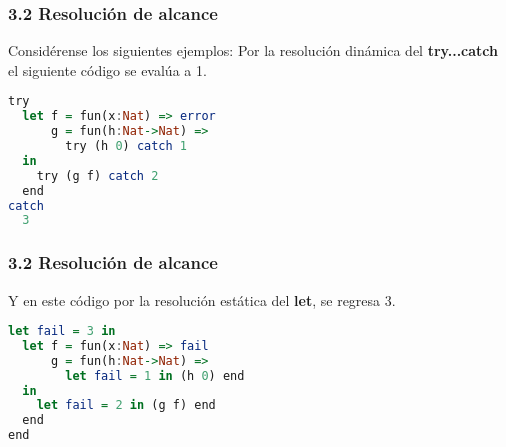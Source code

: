 \documentclass[xcolor=dvipsnames,table,spanish]{beamer}
\begin{document}
\begin{frame}[fragile]
\frametitle{3.2 Resolución de alcance}
Considérense los siguientes ejemplos:\newline
Por la  resolución dinámica del \textbf{try...catch} el siguiente código se evalúa a 1.
\begin{example}
\begin{lstlisting}[language=Haskell]
try
  let f = fun(x:Nat) => error
      g = fun(h:Nat->Nat) =>
      	try (h 0) catch 1
  in
    try (g f) catch 2
  end
catch
  3

\end{lstlisting}
\end{example}
\end{frame}

\begin{frame}[fragile]
\frametitle{3.2 Resolución de alcance}
Y en este código por la resolución estática del \textbf{let}, se regresa 3.
\begin{example}
\begin{lstlisting}[language=Haskell]
let fail = 3 in
  let f = fun(x:Nat) => fail
      g = fun(h:Nat->Nat) =>
      	let fail = 1 in (h 0) end
  in
    let fail = 2 in (g f) end
  end
end

\end{lstlisting}
\end{example}
\end{frame}
\end{document}
